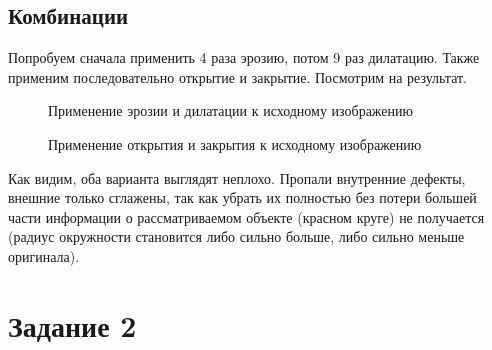 \documentclass[a4paper, 12pt]{article}
\begin{document}
    \subsection{Комбинации}
    Попробуем сначала применить 4 раза эрозию, потом 9 раз дилатацию. Также применим последовательно открытие и закрытие. Посмотрим на результат.
    \begin{figure}[H]
        \centering
        \captionsetup{skip=0pt}
        \caption{Применение эрозии и дилатации к исходному изображению}
        \label{fig:erdil1}
    \end{figure}
    \begin{figure}[H]
        \centering
        \captionsetup{skip=0pt}
        \caption{Применение открытия и закрытия к исходному изображению}
        \label{fig:opcl1}
    \end{figure}
    Как видим, оба варианта выглядят неплохо. Пропали внутренние дефекты, внешние только сглажены, так как убрать их
    полностью без потери большей части информации о рассматриваемом объекте (красном круге) не получается (радиус окружности
    становится либо сильно больше, либо сильно меньше оригинала).


    \section{Задание 2}
\end{document}
